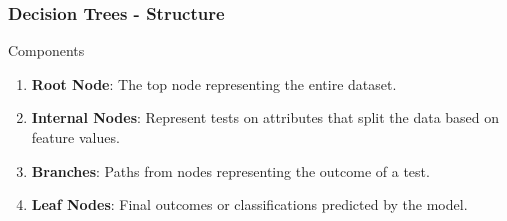 \documentclass[aspectratio=169]{beamer}
\begin{document}
\begin{frame}[fragile]
    \frametitle{Decision Trees - Structure}
    \begin{block}{Components}
        \begin{enumerate}
            \item \textbf{Root Node}: The top node representing the entire dataset.
            \item \textbf{Internal Nodes}: Represent tests on attributes that split the data based on feature values.
            \item \textbf{Branches}: Paths from nodes representing the outcome of a test.
            \item \textbf{Leaf Nodes}: Final outcomes or classifications predicted by the model.
        \end{enumerate}
    \end{block}
\end{frame}
\end{document}
